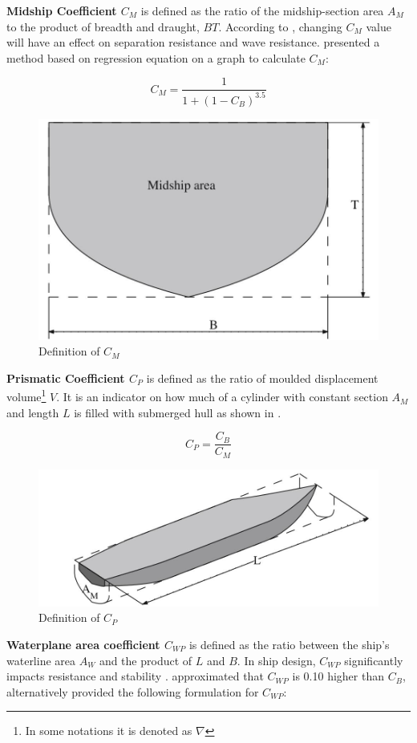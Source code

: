 \textbf{Midship Coefficient $C_M$} is defined as the ratio of the midship-section area $A_M$ to the product of breadth and draught, $BT$. According to , changing $C_M$ value will have an effect on separation resistance and wave resistance.  presented a method based on regression equation on a graph to calculate $C_M$:  

\begin{equation}
    \label{eqn:CM_jensen}
    C_M = \frac{1}{1+(1-C_B)^{3.5}}
\end{equation}

\begin{figure}[ht]
    \centering
        \includegraphics[width=.5\textwidth]{02_figures/biran14_cm.jpg}
        \caption{Definition of $C_M$ }
        \label{fig:biran_cm}
\end{figure}

\textbf{Prismatic Coefficient $C_P$} is defined as the ratio of moulded displacement volume\footnote{In some notations it is denoted as $\nabla$} $V$. It is an indicator on how much of a cylinder with constant section $A_M$ and length $L$ is filled with submerged hull as shown in .

\begin{equation}
    \label{eqn:cp_ratio}
    C_P = \frac{C_B}{C_M}
\end{equation}

\begin{figure}[ht]
    \centering
        \includegraphics[width=.5\textwidth]{02_figures/biran14_cp.jpg}
        \caption{Definition of $C_P$ }
        \label{fig:biran_cp}
\end{figure}

\textbf{Waterplane area coefficient $C_{WP}$} is defined as the ratio between the ship's waterline area $A_{W}$ and the product of $L$ and $B$. In ship design, $C_{WP}$ significantly impacts resistance and stability .  approximated that $C_{WP}$ is 0.10 higher than $C_B$, alternatively  provided the following formulation for $C_{WP}$:

